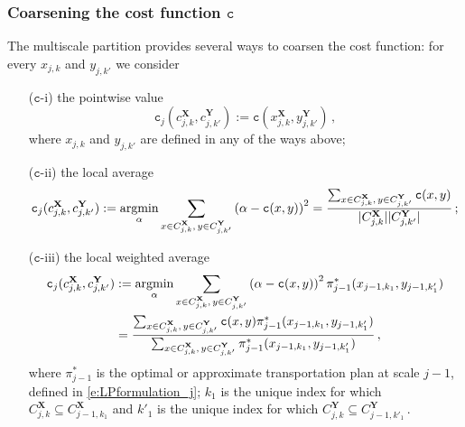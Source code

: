 \documentclass[twoside,11pt]{article}
\newcommand{\cost}[0]{\mathtt{c}}
\newcommand{\coupling}[0]{\pi}
\def\argmin{\mathop{\rm argmin}}
\newcommand{\Xsp}{{\mathbf{X}}}
\newcommand{\Ysp}{{\mathbf{Y}}}
\begin{document}
\subsubsection{Coarsening the cost function $\cost$}
The multiscale partition provides several ways to coarsen the cost function: for
every $x_{j,k}$ and $y_{j,k'}$ we consider
\begin{itemize}
\item[($\cost$-i)] the pointwise value 
  \begin{equation}
\cost_j(c_{j,k}^{\Xsp}, c_{j,k'}^{\Ysp}) := 
  \cost(x_{j,k}^{\Xsp},y_{j,k'}^{\Ysp})\,,
  \label{e:costpointwise}
\end{equation}
where $x_{j,k}$ and $y_{j,k'}$ are defined in any of the ways above;
\item[($\cost$-ii)] the local average 
\begin{equation}
\cost_j(c_{j,k}^{\Xsp}, c_{j,k'}^{\Ysp}) := 
\argmin_{\alpha} \sum_{\substack{x\in C^{{\Xsp}}_{j,k},\,y \in
C^{{\Ysp}}_{j,k'}}}\left(\alpha-\cost(x,y)\right)^2 
= \frac{\sum_{\substack{x\in C^{{\Xsp}}_{j,k},\,y\in
C^{{\Ysp}}_{j,k'}}}\cost(x,y)}{|C_{j,k}^{{\Xsp}}| |C_{j,k'}^{{\Ysp}}|}\,;
\label{e:costlocalave}
\end{equation}
\item[($\cost$-iii)] the local weighted average 
\begin{align*}
\cost_j(c_{j,k}^{\Xsp},c_{j,k'}^{\Ysp})
&:=\argmin_{\alpha}\sum_{\substack{x\in C^{{\Xsp}}_{j,k},\, y\in
C^{{\Ysp}}_{j,k'}}}\left(\alpha-\cost(x,y)\right)^2
\coupling^*_{j-1}(x_{j-1,k_1},y_{j-1,k'_1})\\ 
&=\frac{\sum_{\substack{x\in C^{{\Xsp}}_{j,k},\,y\in C^{{\Ysp}}_{j,k'}}}\cost(x,y)\coupling^*_{j-1}(x_{j-1,k_1},y_{j-1,k'_1})}{
\sum_{\substack{x\in C^{{\Xsp}}_{j,k},\,y\in C^{{\Ysp}}_{j,k'}}}\coupling^*_{j-1}(x_{j-1,k_1},y_{j-1,k'_1})
}\,,
\end{align*}
where $\pi^*_{j-1}$ is the optimal or approximate transportation plan at scale
$j-1$, defined in \eqref{e:LPformulation_j}; $k_1$ is the unique index for
which $C^{{\Xsp}}_{j,k}\subseteq C^{{\Xsp}}_{j-1,k_1}$ and $k'_1$ is the unique
index for which $C^{{\Ysp}}_{j,k}\subseteq C^{{\Ysp}}_{j-1,k'_1}\,.$ 
\end{itemize}
\end{document}
